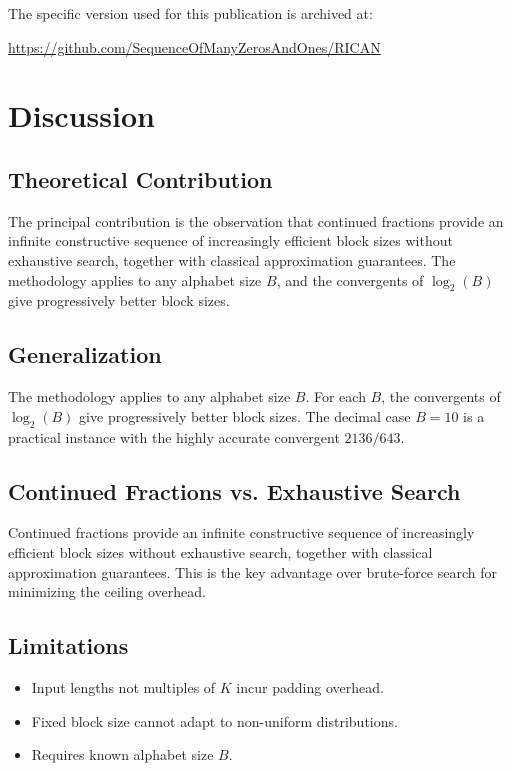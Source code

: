 \documentclass[10pt, conference]{IEEEtran}
\begin{document}
The specific version used for this publication is archived at:
\begin{center}
\url{https://github.com/SequenceOfManyZerosAndOnes/RICAN}
\end{center}

\section{Discussion}

\subsection{Theoretical Contribution}

The principal contribution is the observation that continued fractions provide an infinite constructive sequence of increasingly efficient block sizes without exhaustive search, together with classical approximation guarantees. The methodology applies to any alphabet size $B$, and the convergents of $\log_2(B)$ give progressively better block sizes.

\subsection{Generalization}

The methodology applies to any alphabet size $B$. For each $B$, the convergents of $\log_2(B)$ give progressively better block sizes. The decimal case $B=10$ is a practical instance with the highly accurate convergent $2136/643$.

\subsection{Continued Fractions vs. Exhaustive Search}

Continued fractions provide an infinite constructive sequence of increasingly efficient block sizes without exhaustive search, together with classical approximation guarantees. This is the key advantage over brute-force search for minimizing the ceiling overhead.

\subsection{Limitations}

\begin{itemize}
    \item Input lengths not multiples of $K$ incur padding overhead.
    \item Fixed block size cannot adapt to non-uniform distributions.
    \item Requires known alphabet size $B$.
\end{itemize}
\end{document}
